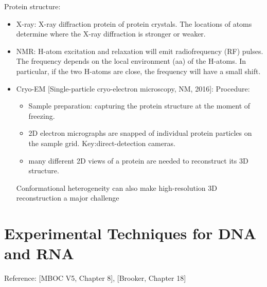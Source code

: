\documentclass{report}
\begin{document}
Protein structure: 
\begin{itemize}
\item X-ray: X-ray diffraction protein of protein crystals. The locations of atoms determine where the X-ray diffraction is stronger or weaker. 

\item NMR: H-atom excitation and relaxation will emit radiofrequency (RF) pulses. The frequency depends on the local environment (aa) of the H-atoms. In particular, if the two H-atoms are close, the frequency will have a small shift. 

\item Cryo-EM [Single-particle cryo-electron microscopy, NM, 2016]: Procedure: 
\begin{itemize}
	\item Sample preparation: capturing the protein structure at the moment of freezing. 
	\item 2D electron micrographs are snapped of individual protein particles on the sample grid. Key:direct-detection cameras.
	\item many different 2D views of a protein are needed to reconstruct its 3D structure.
\end{itemize}
Conformational heterogeneity can also make high-resolution 3D reconstruction a major challenge
\end{itemize}

\section{Experimental Techniques for DNA and RNA} 

Reference: [MBOC V5, Chapter 8], [Brooker, Chapter 18]
\end{document}
